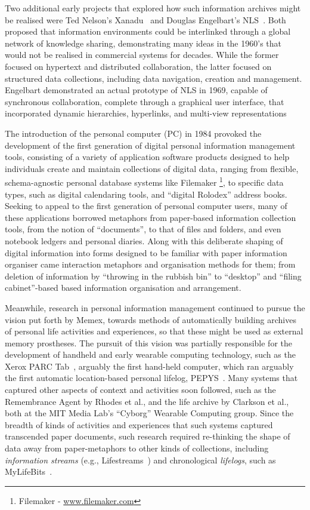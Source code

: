 \documentclass[graybox]{svmult}
\begin{document}
Two additional early projects that explored how such information archives might be realised were Ted Nelson’s Xanadu~\cite{nelson1987literary} and Douglas Engelbart's NLS~\cite{engelbart1968research}.  Both proposed that information environments could be interlinked through a global network of knowledge sharing, demonstrating many ideas in the 1960’s that would not be realised in commercial systems for decades.  While the former focused on hypertext and distributed collaboration, the latter focused on structured data collections, including data navigation, creation and management.  Engelbart demonstrated an actual prototype of NLS in 1969, capable of synchronous collaboration, complete through a graphical user interface, that incorporated dynamic hierarchies, hyperlinks, and multi-view representations  

The introduction of the personal computer (PC) in 1984 provoked the development of the first generation of digital personal information management tools, consisting of a variety of application software products designed to help individuals create and maintain collections of digital data, ranging from flexible, schema-agnostic personal database systems like Filemaker \footnote{Filemaker - \url{www.filemaker.com}}, to specific data types, such as digital calendaring tools, and ``digital Rolodex'' address books.  Seeking to appeal to the first generation of personal computer users, many of these applications borrowed metaphors from paper-based information collection tools, from the notion of ``documents'', to that of files and folders, and even notebook ledgers and personal diaries. Along with this deliberate shaping of digital information into forms designed to be familiar with paper information organiser came interaction metaphors and organisation methods for them; from deletion of information by ``throwing in the rubbish bin'' to ``desktop'' and ``filing cabinet''-based based information organisation and arrangement.

Meanwhile, research in personal information management continued to pursue the vision put forth by Memex, towards methods of automatically building archives of personal life activities and experiences, so that these might be used as external memory prostheses.  The pursuit of this vision was partially responsible for the development of handheld and early wearable computing technology, such as the Xerox PARC Tab~\cite{schilit1993parctab}, arguably the first hand-held computer, which ran arguably the first automatic location-based personal lifelog, PEPYS~\cite{newman1991pepys}.  Many systems that captured other aspects of context and activities soon followed, such as the Remembrance Agent by Rhodes et al., and the life archive by Clarkson et al., both at the MIT Media Lab's ``Cyborg'' Wearable Computing group. Since the breadth of kinds of activities and experiences that such systems captured transcended paper documents, such research required re-thinking the shape of data away from paper-metaphors to other kinds of collections, including \emph{information streams} (e.g., Lifestreams~\cite{fertig1996lifestreams}) and chronological \emph{lifelogs}, such as MyLifeBits~\cite{gemmell2002mylifebits}.
\end{document}
